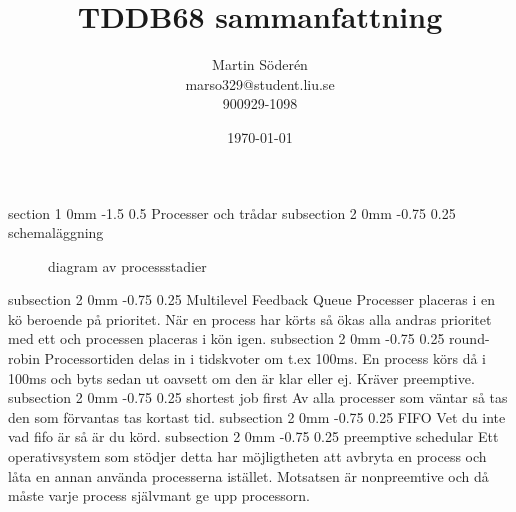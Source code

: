 \documentclass[a4paper,11pt]{article}
\makeatletter
\renewcommand{\section}{\@startsection
   {section}%
   {1}%
   {0mm}%
   {-1.5\baselineskip}%
   {0.5\baselineskip}%
   {\sffamily\bfseries\upshape\normalsize}}%
\renewcommand{\subsection}{\@startsection
   {subsection}%
   {2}%
   {0mm}%
   {-0.75\baselineskip}%
   {0.25\baselineskip}%
   {\rmfamily\normalfont\slshape\normalsize}}%
\makeatother
\begin{document}
\begin{titlepage}
\title{TDDB68 sammanfattning}
\author{Martin Söderén\\ marso329@student.liu.se\\900929-1098}
\date{\today}
\maketitle




\vfill %

\thispagestyle{empty}

\end{titlepage}
\section{Processer och trådar}
\subsection{schemaläggning}
\begin{figure}[h]
\scalebox{0.8}{}
\caption{diagram av processstadier} 
\end{figure}
\subsection{Multilevel Feedback Queue}
Processer placeras i en kö beroende på prioritet. När en process har körts så ökas alla andras prioritet med ett och processen placeras i kön igen.
\subsection{round-robin}
Processortiden delas in i tidskvoter om t.ex 100ms. En process körs då i 100ms och byts sedan ut oavsett om den är klar eller ej. Kräver preemptive.
\subsection{shortest job first}
Av alla processer som väntar så tas den som förvantas tas kortast tid.
\subsection{FIFO}
Vet du inte vad fifo är så är du körd.
\subsection{preemptive schedular}
Ett operativsystem som stödjer detta har möjligtheten att avbryta en process och låta en annan använda processerna istället. Motsatsen är nonpreemtive och då måste varje process självmant ge upp processorn.
\end{document}
